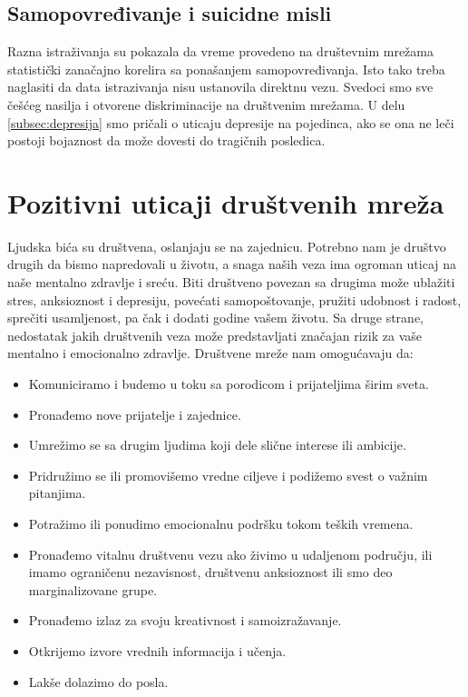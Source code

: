 \documentclass[a4paper]{article}
\begin{document}
{		\subsection{Samopovređivanje i suicidne misli}
		
		Razna istraživanja su pokazala da vreme provedeno na društevnim mrežama statistički zanačajno korelira sa ponašanjem samopovređivanja. Isto tako treba naglasiti da data istrazivanja nisu ustanovila direktnu vezu. Svedoci smo sve češćeg nasilja i otvorene diskriminacije na društvenim mrežama. U delu \eqref{subsec:depresija} smo pričali o uticaju depresije na pojedinca, ako se ona ne leči postoji bojaznost da može dovesti do tragičnih posledica.
		
		\section{Pozitivni uticaji društvenih mreža}	
		Ljudska bića su društvena, oslanjaju se na zajednicu. Potrebno nam je društvo drugih da bismo napredovali u životu, a snaga naših veza ima ogroman uticaj na naše mentalno zdravlje i sreću. Biti društveno povezan sa drugima može ublažiti stres, anksioznost i depresiju, povećati samopoštovanje, pružiti udobnost i radost, sprečiti usamljenost, pa čak i dodati godine vašem životu. Sa druge strane, nedostatak jakih društvenih veza može predstavljati značajan rizik za vaše mentalno i emocionalno zdravlje. Društvene mreže nam omogućavaju da:
		\begin{itemize}
		\item	Komuniciramo i budemo u toku sa porodicom i prijateljima širim sveta.
		\item Pronađemo nove prijatelje i zajednice.
		\item Umrežimo se sa drugim ljudima koji dele slične interese ili ambicije.
		\item Pridružimo se ili promovišemo vredne ciljeve i podižemo svest o važnim pitanjima.
		\item Potražimo ili ponudimo emocionalnu podršku tokom teških vremena.
		\item Pronađemo vitalnu društvenu vezu ako živimo u udaljenom području, ili imamo ograničenu nezavisnost, društvenu anksioznost ili smo deo marginalizovane grupe.
		\item Pronađemo izlaz za svoju kreativnost i samoizražavanje.
		\item Otkrijemo izvore vrednih informacija i učenja.
		\item Lakše dolazimo do posla.
		

\end{itemize}}
\end{document}
